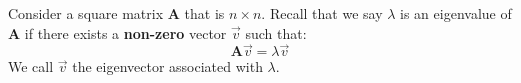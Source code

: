 Consider a square matrix $\mathbf{A}$ that is $n \times n$. Recall that we say $\lambda$ is an eigenvalue of $\mathbf{A}$ if there exists a \textbf{non-zero} vector $\vec{v}$ such that:
$$\mathbf{A}\vec{v} = \lambda\vec{v}$$
We call $\vec{v}$ the eigenvector associated with $\lambda$.


